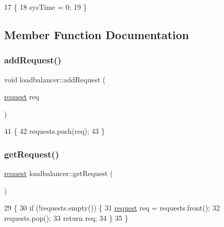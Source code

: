 \begin{DoxyCode}
17                            \{
18     sysTime = 0;
19 \}
\end{DoxyCode}


\subsection{Member Function Documentation}
\mbox{\label{classloadbalancer_a2c45d009dffc50f5d5d3a6c2b295311d}} 
\subsubsection{\texorpdfstring{add\+Request()}{addRequest()}}
{\footnotesize\ttfamily void loadbalancer\+::add\+Request (\begin{DoxyParamCaption}\item[{\hyperlink{structrequest}{request}}]{req }\end{DoxyParamCaption})}


\begin{DoxyCode}
41                                          \{
42     requests.push(req);
43 \}
\end{DoxyCode}
\mbox{\label{classloadbalancer_a3d1715e4b2218a7aa9ad74e3e4fa6167}} 
\subsubsection{\texorpdfstring{get\+Request()}{getRequest()}}
{\footnotesize\ttfamily \hyperlink{structrequest}{request} loadbalancer\+::get\+Request (\begin{DoxyParamCaption}{ }\end{DoxyParamCaption})}


\begin{DoxyCode}
29                                  \{
30     \textcolor{keywordflow}{if} (!requests.empty()) \{
31         \hyperlink{structrequest}{request} req = requests.front();
32         requests.pop();
33         \textcolor{keywordflow}{return} req;
34     \}
35 \}
\end{DoxyCode}
\mbox{\label{classloadbalancer_afc308893c7ab0fc8b92036deae7a2de9}} 

